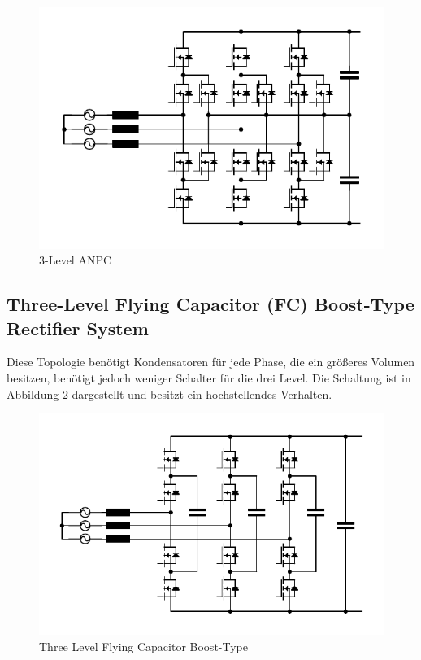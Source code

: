 		\begin{figure}
			\centering
			\includegraphics[width=0.9\linewidth]{content/Grafiken/ANPC}
			\caption{3-Level ANPC}
			\label{fig:anpc}
		\end{figure}
	
	
	\subsection{Three-Level Flying Capacitor (FC) Boost-Type Rectifier System}
		Diese Topologie benötigt Kondensatoren für jede Phase, die ein größeres Volumen besitzen, benötigt jedoch weniger Schalter für die drei Level. Die Schaltung ist in Abbildung \ref{fig:3l-fc-boost} dargestellt und besitzt ein hochstellendes Verhalten.
		\begin{figure}
			\centering
			\includegraphics[width=1\linewidth]{content/Grafiken/3L-FC-Boost}
			\caption{Three Level Flying Capacitor Boost-Type}
			\label{fig:3l-fc-boost}
		\end{figure}
	

